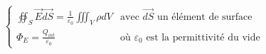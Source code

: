 \[
    \begin{cases}
        \oiint_S{\overrightarrow{E} \overrightarrow{dS}}
        =
        \frac{1}{\varepsilon_0} \iiint_V{\rho dV}
        &
        \mbox{avec } \overrightarrow{dS} \mbox{ un élément de surface}
    \\
        \Phi_E = \frac{Q_{int}}{\varepsilon_0}
        &
        \mbox{où } \varepsilon_0 \mbox{ est la permittivité du vide}
    \end{cases}
\]
